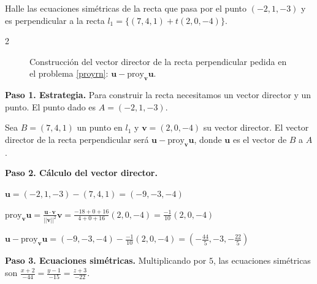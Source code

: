 \begin{example}\label{proyrn}
Halle las ecuaciones simétricas de la recta que pasa por el punto $(-2,1,-3)$ y es perpendicular a la recta $l_1=\{(7,4,1)+t(2,0,-4)\}$.
\begin{myproof}

\begin{multicols}{2}
\begin{figure}[H]
\centering
{}
\caption{Construcción del vector director de la recta perpendicular pedida en el problema \ref{proyrn}: $\mathbf{u}-\text{proy}_{\mathbf{v}}\mathbf{u}$.}
\label{fig:proyrn_construccion}
\end{figure}

\columnbreak

\textbf{Paso 1. Estrategia.} Para construir la recta necesitamos un vector director y un punto. El punto dado es $A=(-2,1,-3)$.

Sea $B=(7,4,1)$ un punto en $l_1$ y $\mathbf{v}=(2,0,-4)$ su vector director. El vector director de la recta perpendicular será $\mathbf{u} - \text{proy}_{\mathbf{v}} \mathbf{u}$, donde $\mathbf{u}$ es el vector de $B$ a $A$.

\end{multicols}

\textbf{Paso 2. Cálculo del vector director.}

$\mathbf{u}=(-2,1,-3)-(7,4,1)=(-9,-3,-4)$

$\text{proy}_{\mathbf{v}} \mathbf{u}=\frac{\mathbf{u} \cdot \mathbf{v}}{||\mathbf{v}||^2} \mathbf{v}=\frac{-18+0+16}{4+0+16} (2,0,-4)= \frac{-1}{10} (2,0,-4)$

$\mathbf{u} - \text{proy}_{\mathbf{v}} \mathbf{u} = (-9,-3,-4) - \frac{-1}{10} (2,0,-4) = \left(-\frac{44}{5}, -3, -\frac{22}{5}\right)$

\textbf{Paso 3. Ecuaciones simétricas.} Multiplicando por $5$, las ecuaciones simétricas son $\boxed{\frac{x+2}{-44}=\frac{y-1}{-15}=\frac{z+3}{-22}}.$
\end{myproof}
\end{example}


